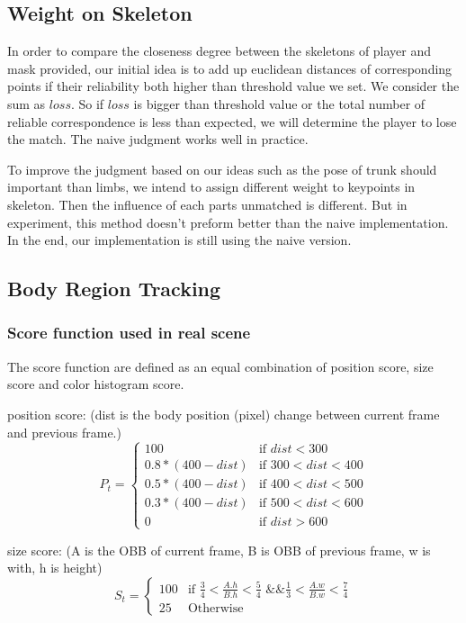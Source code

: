 \documentclass[11pt,twocolumn,letterpaper]{article}
\begin{document}
	\subsection{Weight on Skeleton}
      \par In order to compare the closeness degree between the skeletons of player and mask provided, our initial idea is to add up euclidean distances of corresponding points if their reliability both higher than threshold value we set. We consider the sum as $loss$. So if $loss$ is bigger than threshold value or the total number of reliable correspondence is less than expected, we will determine the player to lose the match. The naive judgment works well in practice.
      \par To improve the judgment based on our ideas such as the pose of trunk should important than limbs, we intend to assign different weight to keypoints in skeleton. Then the influence of each parts unmatched is different. But in experiment, this method doesn't preform better than the naive implementation. In the end, our implementation is still using the naive version.
  \subsection{Body Region Tracking}
\subsubsection{Score function used in real scene}
The score function are defined as an equal combination of position score, size score and color histogram score.
\par
position score: (dist is the body position (pixel) change between current frame and previous frame.)
\begin{equation}
    P_{t}=
   \begin{cases}
   100 &\mbox{if $dist < 300$}\\
   0.8*(400-dist) &\mbox{if $300 < dist < 400$}\\
0.5*(400-dist) &\mbox{if $400 < dist < 500$}\\
0.3*(400-dist) &\mbox{if $500 < dist < 600$}\\
0 &\mbox{if $dist > 600$}
   \end{cases}
  \end{equation}

size score: (A is the OBB of current frame, B is OBB of previous frame, w is with, h is height)
\begin{equation}
    S_{t}=
   \begin{cases}
   100 &\mbox{if $\frac{3}{4} < \frac{A.h}{B.h} < \frac{5}{4} $ \&\& $\frac{1}{3} < \frac{A.w}{B.w} < \frac{7}{4} $}\\
25 &\mbox{Otherwise}
   \end{cases}
  \end{equation}
\end{document}
